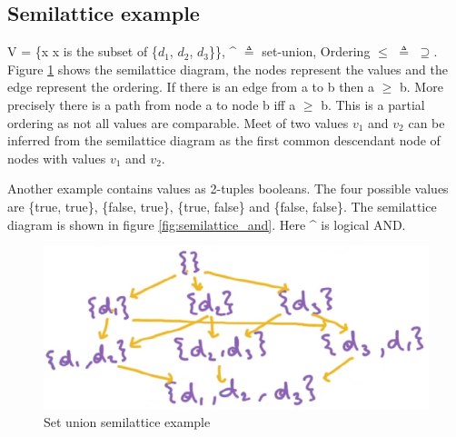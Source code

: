 \subsection{Semilattice example}
V = \{x {\textbar} x is the subset of \{$d_{1}$, $d_{2}$, $d_{3}$\}\}, \^{} $\triangleq$ set-union, 
Ordering $\leq$ $\triangleq$ $\supseteq$. Figure \ref{fig:semilattice_union} shows the semilattice diagram, the nodes represent the values and the edge represent the ordering. If there is an edge from a to b then a $\geq$ b. More precisely there is a path from node a to node b iff a $\geq$ b. This is a partial ordering as not all values are comparable. Meet of two values $v_{1}$ and $v_{2}$ can be inferred from the semilattice diagram as the first common descendant node of nodes with values $v_{1}$ and $v_{2}$.\par
Another example contains values as 2-tuples booleans. The four possible values are \{true, true\}, \{false, true\}, \{true, false\} and \{false, false\}. The semilattice diagram is shown in figure \ref{fig:semilattice_and}. Here \^{} is logical AND.
\begin{figure}
    \centering
    \includegraphics[width=1\linewidth]{images/semilatticeSetUnion.png}
    \caption{Set union semilattice example}
    \label{fig:semilattice_union}
\end{figure}
